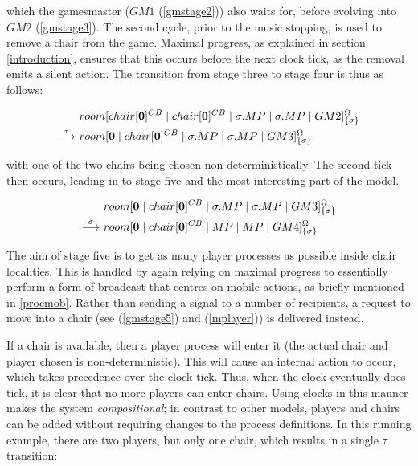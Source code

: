 \noindent which the gamesmaster ($GM1$ (\ref{gmstage2})) also waits for,
before evolving into $GM2$ (\ref{gmstage3}).  The second cycle, prior
to the music stopping, is used to remove a chair from the game.  Maximal
progress, as explained in section \ref{introduction}, ensures that this
occurs before the next clock tick, as the removal emits a silent action.
The transition from stage three to stage four is thus as follows:

\begin{equation}
\begin{aligned}
& {room}[ {chair}[ \textbf{0} ]^{CB} \;|\; {chair}[ \textbf{0} ]^{CB} \;|\; 
   \sigma.MP \;|\; \sigma.MP \;|\;
   GM2 ]^{\Omega}_{\{\sigma\}} \\
 \stackrel{\tau}{\longrightarrow}\ & {room}[ \textbf{0} \;|\; {chair}[ \textbf{0} ]^{CB} \;|\; 
   \sigma.MP \;|\; \sigma.MP \;|\;
   GM3 ]^{\Omega}_{\{\sigma\}}
\end{aligned}
\end{equation}

\noindent with one of the two chairs being chosen non-deterministically.
The second tick then occurs, leading in to stage five and the most
interesting part of the model.

\begin{equation}
\begin{aligned}
& {room}[ \textbf{0} \;|\; {chair}[ \textbf{0} ]^{CB} \;|\; 
   \sigma.MP \;|\; \sigma.MP \;|\;
   GM3 ]^{\Omega}_{\{\sigma\}} \\
\stackrel{\sigma}{\longrightarrow}\ & {room}[ \textbf{0} \;|\; {chair}[ \textbf{0} ]^{CB} \;|\; 
   MP \;|\; MP \;|\;
   GM4 ]^{\Omega}_{\{\sigma\}} \\
\end{aligned}
\end{equation}

The aim of stage five is to get as many player processes as possible
inside chair localities.  This is handled by again relying on maximal
progress to essentially perform a form of broadcast that centres on
mobile actions, as briefly mentioned in \ref{procmob}.  Rather than
sending a signal to a number of recipients, a request to move into a
chair (see (\ref{gmstage5}) and (\ref{mplayer})) is delivered instead.

If a chair is available, then a player process will enter it (the actual
chair and player chosen is non-deterministic).  This will cause an
internal action to occur, which takes precedence over the clock tick.
Thus, when the clock eventually does tick, it is clear that no more
players can enter chairs. Using clocks in this manner makes the system
\emph{compositional}; in contrast to other models, players and chairs
can be added without requiring changes to the process definitions.  In
this running example, there are two players, but only one chair, which
results in a single $\tau$ transition:

